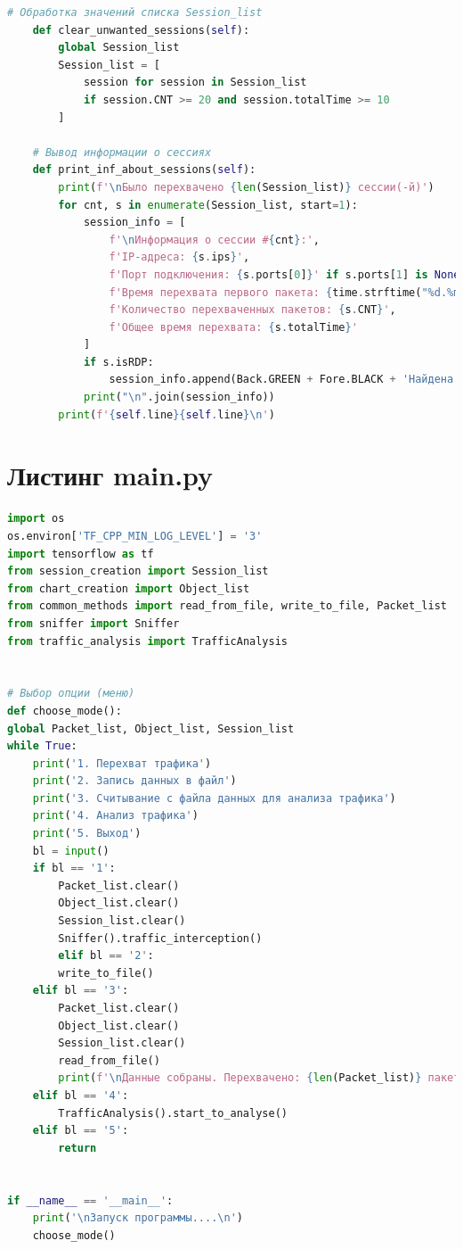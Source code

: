 \documentclass[spec, och, diploma]{SCWorks}
\begin{document}
\begin{lstlisting}[language=Python]
    # Обработка значений списка Session_list
    def clear_unwanted_sessions(self):
        global Session_list
        Session_list = [
            session for session in Session_list
            if session.CNT >= 20 and session.totalTime >= 10
        ]
    
    # Вывод информации о сессиях
    def print_inf_about_sessions(self):
        print(f'\nБыло перехвачено {len(Session_list)} сессии(-й)')
        for cnt, s in enumerate(Session_list, start=1):
            session_info = [
                f'\nИнформация о сессии #{cnt}:',
                f'IP-адреса: {s.ips}',
                f'Порт подключения: {s.ports[0]}' if s.ports[1] is None else f'Порты подключения: {s.ports}',
                f'Время перехвата первого пакета: {time.strftime("%d.%m.%Y г. %H:%M:%S", time.localtime(s.strt_time))}',
                f'Количество перехваченных пакетов: {s.CNT}',
                f'Общее время перехвата: {s.totalTime}'
            ]
            if s.isRDP:
                session_info.append(Back.GREEN + Fore.BLACK + 'Найдена RDP-сессия!!!')
            print("\n".join(session_info))
        print(f'{self.line}{self.line}\n')
    \end{lstlisting}


    \section{Листинг main.py}

    \begin{lstlisting}[language=Python]
import os
os.environ['TF_CPP_MIN_LOG_LEVEL'] = '3'
import tensorflow as tf
from session_creation import Session_list
from chart_creation import Object_list
from common_methods import read_from_file, write_to_file, Packet_list
from sniffer import Sniffer
from traffic_analysis import TrafficAnalysis


# Выбор опции (меню)
def choose_mode():
global Packet_list, Object_list, Session_list
while True:
    print('1. Перехват трафика')
    print('2. Запись данных в файл')
    print('3. Считывание с файла данных для анализа трафика')
    print('4. Анализ трафика')
    print('5. Выход')
    bl = input()
    if bl == '1':
        Packet_list.clear()
        Object_list.clear()
        Session_list.clear()
        Sniffer().traffic_interception()
        elif bl == '2':
        write_to_file()
    elif bl == '3':
        Packet_list.clear()
        Object_list.clear()
        Session_list.clear()
        read_from_file()
        print(f'\nДанные собраны. Перехвачено: {len(Packet_list)} пакетов(-а)\n')
    elif bl == '4':
        TrafficAnalysis().start_to_analyse()
    elif bl == '5':
        return  


if __name__ == '__main__':
    print('\nЗапуск программы....\n')
    choose_mode()
    \end{lstlisting}
\end{document}
